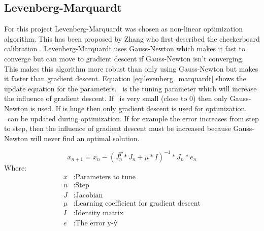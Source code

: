 \documentclass[11pt,a4paper,titlepage,oneside]{report}
\begin{document}
\subsection{Levenberg-Marquardt}
For this project Levenberg-Marquardt was chosen as non-linear optimization algorithm. This has been proposed by Zhang who first described the checkerboard calibration \cite{Zhang}. Levenberg-Marquardt uses Gauss-Newton which makes it fast to converge but can move to gradient descent if Gauss-Newton isn't converging. This makes this algorithm more robust than only using Gauss-Newton but makes it faster than gradient descent. Equation \ref{eq:levenberg_marquardt} shows the update equation for the parameters. \mu\ is the tuning parameter which will increase the influence of gradient descent. If \mu\ is very small (close to 0) then only Gauss-Newton is used. If \mu is huge then only gradient descent is used for optimization. \mu\ can be updated during optimization. If for example the error increases from step to step, then the influence of gradient descent must be increased because Gauss-Newton will never find an optimal solution.

\begin{equation}\label{eq:levenberg_marquardt}
  x_{n+1} = x_n - (J_n^T*J_n + \mu*I)^{-1}*J_n*e_n
\end{equation}
Where:
\begin{align*}
  x		  &: \text{Parameters to tune}\\
  n		  &: \text{Step}\\
  J		  &: \text{Jacobian}\\
  \mu	  &: \text{Learning coefficient for gradient descent}\\
  I     &: \text{Identity matrix}\\
  e  	  &: \text{The error y-ŷ}
\end{align*}
\end{document}
